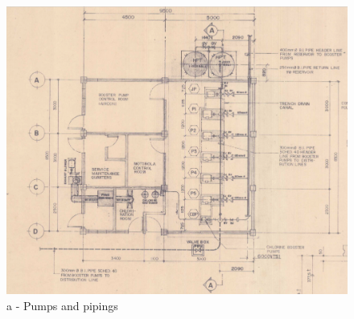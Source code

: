 \begin{figure}[!htb]
	\begin{minipage}[b]{0.5\linewidth}
		\centering
		\includegraphics[width=\textwidth]{figures/fig_ch043_asbuilt_layout1}
		\caption*{a - Pumps and pipings}
	\end{minipage}
	\hspace{0.05cm}
	\begin{minipage}[b]{0.3\linewidth}
		\centering

\end{minipage}
\end{figure}
